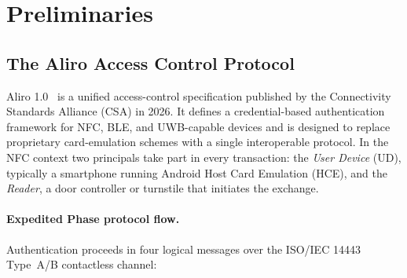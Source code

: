 \documentclass[runningheads]{llncs}
\begin{document}
\section{Preliminaries}
\label{sec:prelim}

\subsection{The Aliro Access Control Protocol}
\label{sec:aliro}

Aliro 1.0~\cite{CSA:Aliro10} is a unified access-control specification published by the
Connectivity Standards Alliance (CSA) in 2026.  It defines a credential-based
authentication framework for NFC, BLE, and UWB-capable devices and is designed
to replace proprietary card-emulation schemes with a single interoperable
protocol.  In the NFC context two principals take part in every transaction:
the \emph{User Device} (UD), typically a smartphone running Android Host Card
Emulation (HCE), and the \emph{Reader}, a door controller or turnstile that
initiates the exchange.

\paragraph{Expedited Phase protocol flow.}
Authentication proceeds in four logical messages over the ISO/IEC 14443 Type~A/B
contactless channel:
\end{document}
